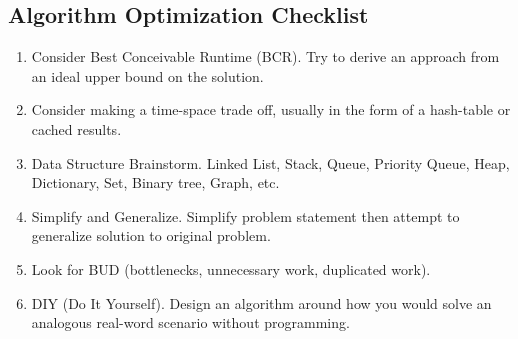 \documentclass{article}
\begin{document}
\subsection{Algorithm Optimization Checklist}
\begin{enumerate}
    \item Consider Best Conceivable Runtime (BCR). Try to derive an approach from an ideal upper bound on the solution.
    \item Consider making a time-space trade off, usually in the form of a hash-table or cached results.
    \item Data Structure Brainstorm. Linked List, Stack, Queue, Priority Queue, Heap, Dictionary, Set, Binary tree, Graph, etc.
    \item Simplify and Generalize. Simplify problem statement then attempt to generalize solution to original problem.
    \item Look for BUD (bottlenecks, unnecessary work, duplicated work).
    \item DIY (Do It Yourself). Design an algorithm around how you would solve an analogous real-word scenario without programming.
\end{enumerate}
\end{document}
